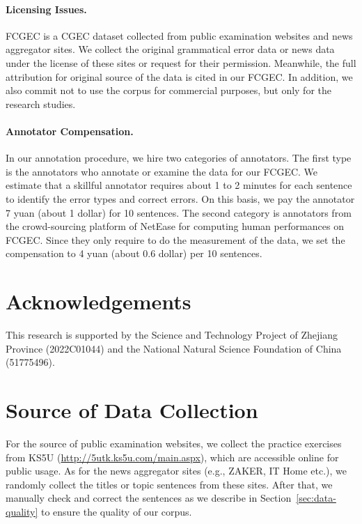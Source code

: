 \documentclass[11pt]{article}
\begin{document}
\paragraph{Licensing Issues.} FCGEC is a CGEC dataset collected from public examination websites and news aggregator sites. We collect the original grammatical error data or news data under the license of these sites or request for their permission. Meanwhile, the full attribution for original source of the data is cited in our FCGEC. In addition, we also commit not to use the corpus for commercial purposes, but only for the research studies.

\paragraph{Annotator Compensation.} In our annotation procedure, we hire two categories of annotators. The first type is the annotators who annotate or examine the data for our FCGEC. We estimate that a skillful annotator requires about 1 to 2 minutes for each sentence to identify the error types and correct errors. On this basis, we pay the annotator 7 yuan (about 1 dollar) for 10 sentences. The second category is annotators from the crowd-sourcing platform of NetEase for computing human performances on FCGEC. Since they only require to do the measurement of the data, we set the compensation to 4 yuan (about 0.6 dollar) per 10 sentences. 
\section*{Acknowledgements}
This research is supported by the Science and Technology Project of Zhejiang Province (2022C01044) and the National Natural Science Foundation of China (51775496). 



\appendix

\clearpage
\appendix

\section{Source of Data Collection}
\label{appendix:source}

For the source of public examination websites, we collect the practice exercises from KS5U (\url{http://5utk.ks5u.com/main.aspx}), which are accessible online for public usage. As for the news aggregator sites (e.g., ZAKER, IT Home etc.), we randomly collect the titles or topic sentences from these sites. After that, we manually check and correct the sentences as we describe in Section~\ref{sec:data-quality} to ensure the quality of our corpus.
\end{document}
